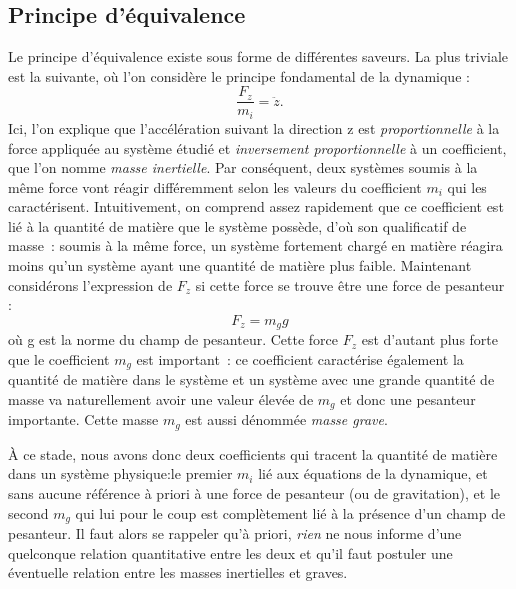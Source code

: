 \subsection{Principe d'équivalence}
Le principe d'équivalence existe sous forme de différentes saveurs. La plus triviale est la suivante, où l'on considère le principe fondamental de la dynamique :
\begin{equation}
\frac{F_z}{m_i}=\ddot z.
\end{equation}
Ici, l'on explique que l'accélération suivant la direction z est \textit{proportionnelle} à la force appliquée au système étudié et \textit{inversement proportionnelle} à un coefficient, que l'on nomme \textit{masse inertielle}. Par conséquent, deux systèmes soumis à la même force vont réagir différemment selon les valeurs du coefficient $m_i$ qui les caractérisent. Intuitivement, on comprend assez rapidement que ce coefficient est lié à la quantité de matière que le système possède, d'où son qualificatif de masse~: soumis à la même force, un système fortement chargé en matière réagira moins qu'un système ayant une quantité de matière plus faible. Maintenant considérons l'expression de $F_z$ si cette force se trouve être une force de pesanteur :
\begin{equation}
F_z=m_g g
\end{equation}
où g est la norme du champ de pesanteur. Cette force $F_z$ est d'autant plus forte que le coefficient $m_g$ est important~: ce coefficient caractérise également la quantité de matière dans le système et un système avec une grande quantité de masse va naturellement avoir une valeur élevée de $m_g$ et donc une pesanteur importante. Cette masse $m_g$ est aussi dénommée \textit{masse grave}.

À ce stade, nous avons donc deux coefficients qui tracent la quantité de matière dans un système physique:le premier $m_i$ lié aux équations de la dynamique, et sans aucune référence à priori à une force de pesanteur (ou de gravitation),  et le second $m_g$ qui lui pour le coup est complètement lié à la présence d'un champ de pesanteur. Il faut alors se rappeler qu'à priori, \textit{rien} ne nous informe d'une quelconque relation quantitative entre les deux et qu'il faut postuler une éventuelle relation entre les masses inertielles et graves.

